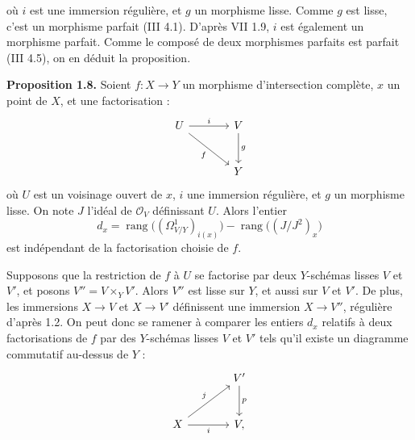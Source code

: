 où $i$ est une
immersion régulière, et $g$ un morphisme lisse. Comme $g$ est lisse, c'est un morphisme parfait (III 4.1). D'après VII 1.9, $i$ est également un morphisme parfait. Comme le composé de deux morphismes parfaits est parfait (III 4.5), on en déduit la proposition.

\textbf{Proposition 1.8.} Soient $f:X\to Y$ un morphisme d'intersection complète, $x$ un point de $X$, et une factorisation :
\[
\begin{tikzcd}[column sep=large,row sep=large]
U \arrow[r,"i"] \arrow[dr,"f"'] & V \arrow[d,"g"]\\
& Y
\end{tikzcd}
\]
où $U$ est un voisinage ouvert de $x$, $i$ une immersion régulière, et $g$ un morphisme lisse. On note $J$ l'idéal de $\mathcal O_V$ définissant $U$. Alors l'entier
\[
d_x=\operatorname{rang}\bigl((\Omega^1_{V/Y})_{i(x)}\bigr)-\operatorname{rang}\bigl((J/J^2)_x\bigr)
\]
est indépendant de la factorisation choisie de $f$.

Supposons que la restriction de $f$ à $U$ se factorise par deux $Y$-schémas lisses $V$ et $V'$, et posons $V''=V\times_Y V'$. Alors $V''$ est lisse sur $Y$, et aussi sur $V$ et $V'$. De plus, les immersions $X\to V$ et $X\to V'$ définissent une immersion $X\to V''$, régulière d'après 1.2. On peut donc se ramener à comparer les entiers $d_x$ relatifs à deux factorisations de $f$ par des $Y$-schémas lisses $V$ et $V'$ tels qu'il existe un diagramme commutatif au-dessus de $Y$ :
\[
\begin{tikzcd}[column sep=large,row sep=large]
& V' \arrow[d,"p"]\\
X \arrow[ur,"j"] \arrow[r,"i"'] & V,
\end{tikzcd}
\]
